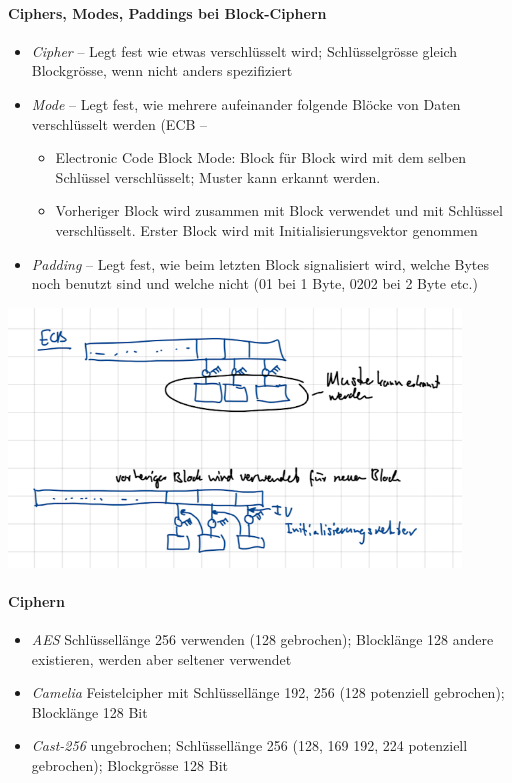 \documentclass[a4paper,12pt]{article}
\begin{document}
\paragraph{Ciphers, Modes, Paddings bei Block-Ciphern}
\begin{itemize}
\item \emph{Cipher} -- Legt fest wie etwas verschlüsselt wird; Schlüsselgrösse gleich Blockgrösse, wenn nicht anders spezifiziert
\item \emph{Mode} -- Legt fest, wie mehrere aufeinander folgende Blöcke von Daten verschlüsselt werden (ECB -- 
\begin{itemize}
\item Electronic Code Block Mode: Block für Block wird mit dem selben Schlüssel verschlüsselt;  Muster kann erkannt werden.
\item Vorheriger Block wird zusammen mit Block verwendet und mit Schlüssel verschlüsselt. Erster Block wird mit Initialisierungsvektor genommen
\end{itemize}
\item \emph{Padding} -- Legt fest, wie beim letzten Block signalisiert wird, welche Bytes noch benutzt sind und welche nicht (01 bei 1 Byte, 0202 bei 2 Byte etc.)
\end{itemize}


\begin{center}
\includegraphics[width=12cm]{img/02_ecb.png}
\end{center}

\paragraph{Ciphern}
\begin{itemize}
\item \emph{AES} Schlüssellänge 256 verwenden (128 gebrochen); Blocklänge 128 andere existieren, werden aber seltener verwendet
\item \emph{Camelia} Feistelcipher mit Schlüssellänge 192, 256 (128 potenziell gebrochen); Blocklänge 128 Bit
\item \emph{Cast-256} ungebrochen; Schlüssellänge 256 (128, 169 192, 224 potenziell gebrochen); Blockgrösse 128 Bit
\end{itemize}
\end{document}

